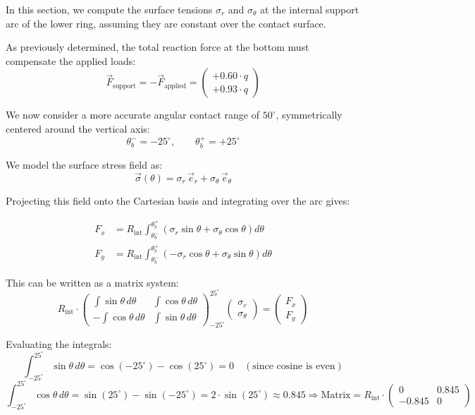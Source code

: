 \documentclass[12pt]{article}
\begin{document}
In this section, we compute the surface tensions $\sigma_r$ and $\sigma_\theta$ at the internal support arc of the lower ring, assuming they are constant over the contact surface.

As previously determined, the total reaction force at the bottom must compensate the applied loads:
\[
\vec{F}_{\text{support}} = -\vec{F}_{\text{applied}} =
\begin{pmatrix}
+0.60 \cdot q \\
+0.93 \cdot q
\end{pmatrix}
\]

We now consider a more accurate angular contact range of $50^\circ$, symmetrically centered around the vertical axis:
\[
\theta_b^- = -25^\circ, \qquad \theta_b^+ = +25^\circ
\]

We model the surface stress field as:
\[
\vec{\sigma}(\theta) = \sigma_r \, \vec{e}_r + \sigma_\theta \, \vec{e}_\theta
\]

Projecting this field onto the Cartesian basis and integrating over the arc gives:

\begin{align*}
F_x &= R_{\text{int}} \int_{\theta_b^-}^{\theta_b^+} \left( \sigma_r \sin\theta + \sigma_\theta \cos\theta \right) d\theta \\
F_y &= R_{\text{int}} \int_{\theta_b^-}^{\theta_b^+} \left( -\sigma_r \cos\theta + \sigma_\theta \sin\theta \right) d\theta
\end{align*}

This can be written as a matrix system:
\[
R_{\text{int}} \cdot
\begin{pmatrix}
\int \sin\theta \, d\theta & \int \cos\theta \, d\theta \\
-\int \cos\theta \, d\theta & \int \sin\theta \, d\theta
\end{pmatrix}_{-25^\circ}^{25^\circ}
\begin{pmatrix}
\sigma_r \\
\sigma_\theta
\end{pmatrix}
=
\begin{pmatrix}
F_x \\
F_y
\end{pmatrix}
\]

Evaluating the integrals:
\[
\int_{-25^\circ}^{25^\circ} \sin\theta \, d\theta = \cos(-25^\circ) - \cos(25^\circ) = 0 \quad (\text{since cosine is even})
\]
\[
\int_{-25^\circ}^{25^\circ} \cos\theta \, d\theta = \sin(25^\circ) - \sin(-25^\circ) = 2 \cdot \sin(25^\circ) \approx 0.845

\Rightarrow
\text{Matrix} =
R_{\text{int}} \cdot
\begin{pmatrix}
0 & 0.845 \\
-0.845 & 0
\end{pmatrix}
\]
\end{document}
